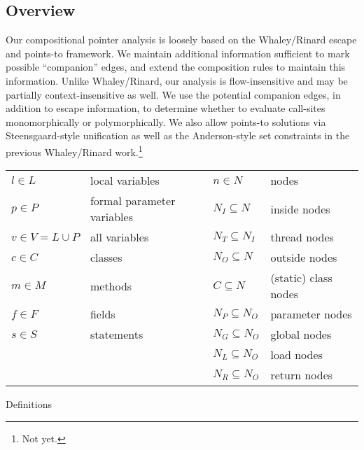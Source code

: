 \documentclass[11pt,notitlepage]{article}
\begin{document}
\subsection{Overview}
Our compositional pointer analysis is loosely based on the Whaley/Rinard
escape and points-to framework.  We maintain additional
information sufficient to mark possible ``companion'' edges, and
extend the composition rules to maintain this information.
Unlike Whaley/Rinard, our analysis is flow-insensitive
and may be partially context-insensitive as well.  
We use the potential companion edges, in addition to escape information,
to determine whether to evaluate call-sites monomorphically or
polymorphically.
We also allow points-to solutions via Steensgaard-style unification as well as
the Anderson-style set constraints in the previous Whaley/Rinard
work.\footnote{Not yet.}

\begin{myfigure}
\begin{tabular}{ll|ll}
$l\in L$ & local variables           &$n\in N$ & nodes\\
$p\in P$ & formal parameter variables&$N_I\subseteq N$ & inside nodes\\
$v\in V=L\cup P$& all variables      &$N_T\subseteq N_I$ & thread nodes\\
$c\in C$ & classes                   &$N_O\subseteq N$ & outside nodes\\
$m\in M$ & methods                   &$C\subseteq N$ & (static) class nodes\\
$f\in F$ & fields                    &$N_P\subseteq N_O$ & parameter nodes\\
$s\in S$ & statements                &$N_G\subseteq N_O$ & global nodes\\
         &                           &$N_L\subseteq N_O$ & load nodes\\
         &                           &$N_R\subseteq N_O$ & return nodes\\
\end{tabular}
\caption{Definitions}
\label{fig:defin}
\end{myfigure}
\end{document}
